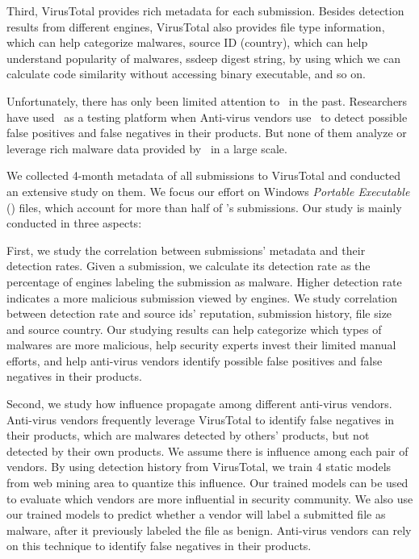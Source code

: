 Third, VirusTotal provides rich metadata for each submission. 
Besides detection results from different engines, 
VirusTotal also provides file type information, which can help categorize malwares, 
source ID (country), which can help understand popularity of malwares, 
ssdeep digest string, by using which we can calculate code similarity without accessing binary executable, and so on. 

Unfortunately, there has only been limited attention to \vt\ in the past. 
Researchers have used \vt\ as a testing platform when 
Anti-virus vendors use \vt\ to detect possible false positives and false negatives in their products. 
But none of them analyze or leverage rich malware data provided by \vt\ in a large scale. 

We collected 4-month metadata of all submissions to VirusTotal 
and conducted an extensive study on them.
We focus our effort on Windows \textit{Portable Executable} ({\em \pe}) files, 
which account for more than half of \vt{}’s submissions.
Our study is mainly conducted in three aspects: 

First, we study the correlation between submissions’ metadata and their detection rates. 
Given a submission, 
we calculate its detection rate as the percentage of engines 
labeling the submission as malware. 
Higher detection rate indicates a more malicious submission viewed by engines.  
We study correlation between detection rate 
and source ids’ reputation, submission history, file size and source country. 
Our studying results can help categorize which types of malwares are more malicious, 
help security experts invest their limited manual efforts, 
and help anti-virus vendors identify possible false positives and false negatives in their products.   


Second, we study how influence propagate among different anti-virus vendors. 
Anti-virus vendors frequently leverage VirusTotal to identify false negatives in their products, 
which are malwares detected by others’ products, 
but not detected by their own products. 
We assume there is influence among each pair of vendors. 
By using detection history from VirusTotal, 
we train 4 static models from web mining area to quantize this influence. 
Our trained models can be used to evaluate which vendors are more influential in security community. 
We also use our trained models to predict whether a vendor will label a submitted file as malware, 
after it previously labeled the file as benign. 
Anti-virus vendors can rely on this technique to identify false negatives in their products. 

